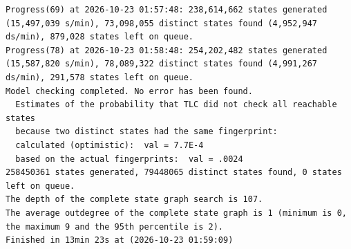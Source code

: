 \documentclass[11pt,a4paper]{article}
\begin{document}
\begin{lstlisting}[float, caption={SaeProvision\_racesfull.cfg result}, captionpos=t, label={lst:tlc-saeprovision-racesfull}]
Progress(69) at 2026-10-23 01:57:48: 238,614,662 states generated (15,497,039 s/min), 73,098,055 distinct states found (4,952,947 ds/min), 879,028 states left on queue.
Progress(78) at 2026-10-23 01:58:48: 254,202,482 states generated (15,587,820 s/min), 78,089,322 distinct states found (4,991,267 ds/min), 291,578 states left on queue.
Model checking completed. No error has been found.
  Estimates of the probability that TLC did not check all reachable states
  because two distinct states had the same fingerprint:
  calculated (optimistic):  val = 7.7E-4
  based on the actual fingerprints:  val = .0024
258450361 states generated, 79448065 distinct states found, 0 states left on queue.
The depth of the complete state graph search is 107.
The average outdegree of the complete state graph is 1 (minimum is 0, the maximum 9 and the 95th percentile is 2).
Finished in 13min 23s at (2026-10-23 01:59:09)
\end{lstlisting}
\bigskip
\end{document}
